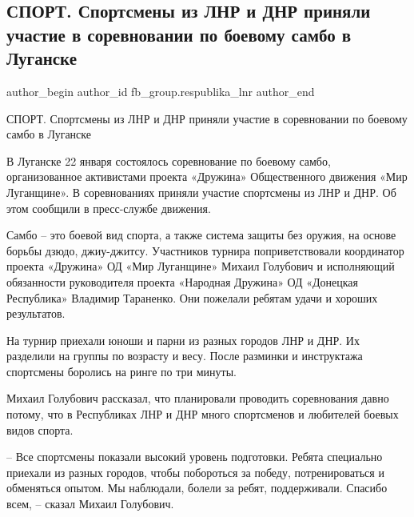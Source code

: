  
 
 
 
 
 
\subsection{СПОРТ. Спортсмены из ЛНР и ДНР приняли участие в соревновании по боевому самбо в Луганске}
\label{sec:23_01_2022.fb.fb_group.respublika_lnr.1.sorev_sambo_lugansk}
 
\ifcmt
 author_begin
   author_id fb_group.respublika_lnr
 author_end
\fi

СПОРТ. Спортсмены из ЛНР и ДНР приняли участие в соревновании по боевому самбо
в Луганске

В Луганске 22 января состоялось соревнование по боевому самбо, организованное
активистами проекта «Дружина» Общественного движения «Мир Луганщине». В
соревнованиях приняли участие спортсмены из ЛНР и ДНР. Об этом сообщили в
пресс-службе движения.

Самбо –  это боевой вид спорта, а также система защиты без оружия, на основе
борьбы дзюдо, джиу-джитсу. Участников турнира поприветствовали координатор
проекта «Дружина» ОД «Мир Луганщине» Михаил Голубович и исполняющий обязанности
руководителя проекта «Народная Дружина» ОД «Донецкая Республика» Владимир
Тараненко. Они пожелали ребятам удачи и хороших результатов.

На турнир приехали юноши и парни из разных городов ЛНР и ДНР. Их разделили на
группы по возрасту и весу. После разминки и инструктажа спортсмены боролись на
ринге по три минуты.

Михаил Голубович рассказал, что планировали проводить соревнования давно
потому, что в Республиках ЛНР и ДНР много спортсменов и любителей боевых видов
спорта.

– Все спортсмены показали высокий уровень подготовки. Ребята специально
приехали из разных городов, чтобы побороться за победу, потренироваться и
обменяться опытом. Мы наблюдали, болели за ребят, поддерживали. Спасибо всем, –
сказал Михаил Голубович.

